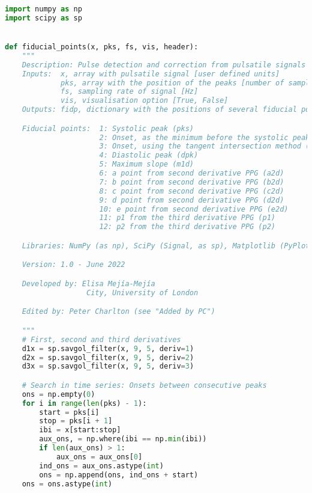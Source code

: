 \begin{lstlisting}[language=Python,label={lst:fidp.py}, basicstyle=\scriptsize]
import numpy as np
import scipy as sp


def fiducial_points(x, pks, fs, vis, header):
    """
    Description: Pulse detection and correction from pulsatile signals
    Inputs:  x, array with pulsatile signal [user defined units]
             pks, array with the position of the peaks [number of samples]
             fs, sampling rate of signal [Hz]
             vis, visualisation option [True, False]
    Outputs: fidp, dictionary with the positions of several fiducial points for the cardiac cycles [number of samples]

    Fiducial points:  1: Systolic peak (pks)
                      2: Onset, as the minimum before the systolic peak (ons)
                      3: Onset, using the tangent intersection method (ti)
                      4: Diastolic peak (dpk)
                      5: Maximum slope (m1d)
                      6: a point from second derivative PPG (a2d)
                      7: b point from second derivative PPG (b2d)
                      8: c point from second derivative PPG (c2d)
                      9: d point from second derivative PPG (d2d)
                      10: e point from second derivative PPG (e2d)
                      11: p1 from the third derivative PPG (p1)
                      12: p2 from the third derivative PPG (p2)

    Libraries: NumPy (as np), SciPy (Signal, as sp), Matplotlib (PyPlot, as plt)

    Version: 1.0 - June 2022

    Developed by: Elisa Mejía-Mejía
                   City, University of London

    Edited by: Peter Charlton (see "Added by PC")

    """
    # First, second and third derivatives
    d1x = sp.savgol_filter(x, 9, 5, deriv=1)
    d2x = sp.savgol_filter(x, 9, 5, deriv=2)
    d3x = sp.savgol_filter(x, 9, 5, deriv=3)

    # Search in time series: Onsets between consecutive peaks
    ons = np.empty(0)
    for i in range(len(pks) - 1):
        start = pks[i]
        stop = pks[i + 1]
        ibi = x[start:stop]
        aux_ons, = np.where(ibi == np.min(ibi))
        if len(aux_ons) > 1:
            aux_ons = aux_ons[0]
        ind_ons = aux_ons.astype(int)
        ons = np.append(ons, ind_ons + start)
    ons = ons.astype(int)


\end{lstlisting}
